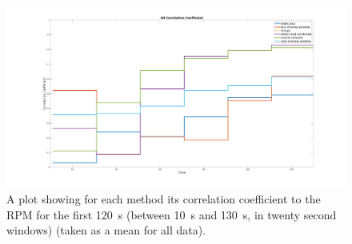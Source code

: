     \begin{figure}
        
        \centering
        
        \includegraphics[width=1.0\linewidth]{figures/all_correlation_coefficient_stairs.png}
        
        
        \vspace{-0.5cm}
        
        \captionsetup{singlelinecheck=false, justification=centering}
        \caption{
        \scriptsize
        A plot showing for each method its correlation coefficient to the \gls{RPM} for the first \SI{120}{\second} (between \SI{10}{\second} and \SI{130}{\second}, in twenty second windows) (taken as a mean for all data).}
        
        \label{fig:all_cross_correlation}
        
        \vspace{-0.5cm}
    \end{figure}
    
    
    
        
    
